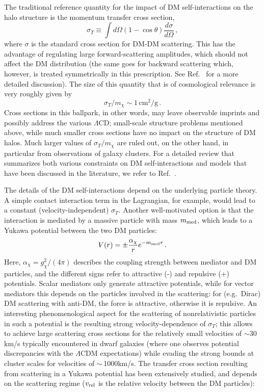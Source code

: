 \documentclass[a4paper,10pt,oneside]{book}
\newcommand{\be}{\begin{equation}}
\newcommand{\ee}{\end{equation}}
\begin{document}
The traditional reference quantity for  the impact of DM self-interactions on the halo 
structure is the momentum transfer cross section,
\be
\label{eq:sigmat}
 \sigma_T \equiv \int d\Omega\left(1-\cos\theta\right)\frac{d\sigma}{d\Omega}\,,
\ee
where $\sigma$ is the standard cross section for DM-DM scattering. 
This has the advantage of regulating large forward-scattering amplitudes, which should
not affect the DM distribution (the same goes for backward scattering which, however,
is treated symmetrically in this prescription. See Ref.~\cite{Tulin:2013teo,Kahlhoefer:2017umn} 
for a more detailed discussion).
The size of this quantity that is of cosmological relevance is very roughly given by
\be
  \sigma_T/m_\chi \sim 1\,\mathrm{cm}^2/\mathrm{g}\,.
\ee
Cross sections in this ballpark, in other words, may leave observable imprints and possibly address 
the various $\Lambda$CD; small-scale structure problems mentioned above, while much smaller cross 
sections have no impact on the structure of DM halos. Much larger values of $\sigma_T/m_\chi$ are 
ruled out, on the other hand, in particular from observations of galaxy clusters. For a detailed 
review that summarizes both various constraints on DM self-interactions and
models that have been discussed in the literature, we refer to Ref.~\cite{Tulin:2017ara}.

The details of the DM self-interactions depend on the underlying particle theory. A simple contact 
interaction term in the Lagrangian, for example, would lead to a constant (velocity-independent)
$\sigma_T$. Another well-motivated option is that the interaction is mediated by a massive particle
with mass $m_{\rm med}$, which leads to a Yukawa potential between the two DM particles:
\be
V(r)=\pm\frac{\alpha_\chi}{r} e^{-m_{\rm med} r}\,.
\ee
Here, $\alpha_\chi=g_\chi^2/(4\pi)$ describes the coupling strength between mediator and DM particles,
and the different signs refer to attractive (-) and repulsive (+) potentials. Scalar mediators only generate
attractive potentials, while for vector mediators this depends on the particles involved in the scattering: 
for (e.g.~Dirac) DM scattering with anti-DM, the force is attractive, otherwise it is repulsive. An interesting 
phenomenological aspect for the scattering of nonrelativistic particles in such a potential is the resulting 
strong velocity-dependence 
of $\sigma_T$; this allows to achieve large scattering cross sections for the relatively small velocities 
of $\sim$30\,km/s typically encountered
in dwarf galaxies (where one observes potential discrepancies with the $\Lambda$CDM expectations)
while evading the strong bounds at cluster scales for velocities of $\sim$\,1000km/s.
The transfer cross section resulting from scattering in a Yukawa potential has been extensively 
studied, and depends on the scattering regime ($v_{\rm rel}$ is the relative velocity between the
DM particles):
\end{document}
